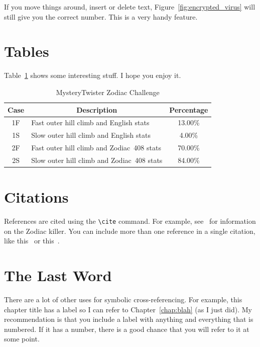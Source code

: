 If you move things around, insert or delete text, Figure~\ref{fig:encrypted_virus}
will still give you the correct number. This is a very handy feature.


\section{Tables}

Table~\ref{tab:19} 
shows some interesting stuff. I hope you enjoy it.

\begin{table}[htb]
\caption{MysteryTwister Zodiac Challenge\label{tab:19}}
\begin{center}
\begin{tabular}{c|lc}\hline\hline
Case & \multicolumn{1}{c}{Description} & Percentage\\ \hline
1F & Fast outer hill climb and English stats & 13.00\% \\
1S & Slow outer hill climb and English stats & \phantom{0}4.00\% \\
2F & Fast outer hill climb and Zodiac~408 stats & 70.00\% \\
2S & Slow outer hill climb and Zodiac~408 stats & 84.00\% \\ \hline\hline
\end{tabular}
\end{center}
\end{table}


\section{Citations}

References are cited using the \verb+\cite+ command. For example,
see~\cite{harden} for information on the Zodiac killer. You can include more than one 
reference in a single citation, like this~\cite{harden,bib1,basa,bib3,bib2,glurk,bib7,bib10,bib11}
or this~\cite{bibAC,bib17}.


\section{The Last Word}

There are a lot of other uses for symbolic cross-referencing. For example, this chapter
title has a label so I can refer to Chapter~\ref{chap:blah} (as I just did).
My recommendation is that you include a label with anything and everything that 
is numbered. If it has a number, there is a good chance that you will
refer to it at some point.

